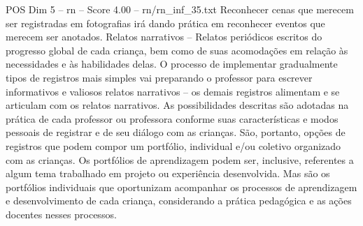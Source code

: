 \begin{textsample}{POS Dim 5 – rn – Score 4.00 – rn/rn\_inf\_35.txt}
Reconhecer cenas que merecem ser registradas em fotografias irá dando prática em reconhecer eventos que merecem ser anotados.
Relatos narrativos – Relatos periódicos escritos do progresso global de cada criança, bem como de suas acomodações em relação às necessidades e às habilidades delas.
O processo de implementar gradualmente tipos de registros mais simples vai preparando o professor para escrever informativos e valiosos relatos narrativos – os demais registros alimentam e se articulam com os relatos narrativos.
As possibilidades descritas são adotadas na prática de cada professor ou professora conforme suas características e modos pessoais de registrar e de seu diálogo com as crianças.
São, portanto, opções de registros que podem compor um portfólio, individual e/ou coletivo organizado com as crianças.
Os portfólios de aprendizagem podem ser, inclusive, referentes a algum tema trabalhado em projeto ou experiência desenvolvida.
Mas são os portfólios individuais que oportunizam acompanhar os processos de aprendizagem e desenvolvimento de cada criança, considerando a prática pedagógica e as ações docentes nesses processos.

\end{textsample}
